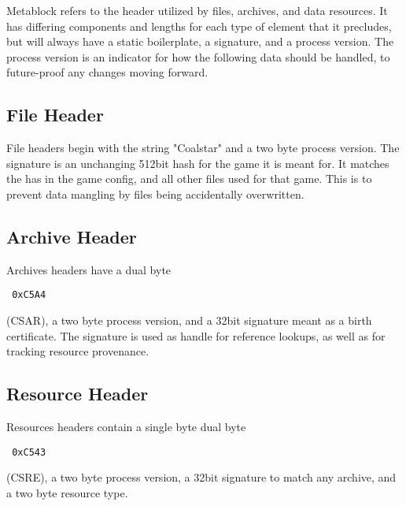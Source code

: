 Metablock refers to the header utilized by files, archives, and data resources. It has differing components and lengths for each type of element that it precludes, but will always have a static boilerplate, a signature, and a process version. The process version is an indicator for how the following data should be handled, to future-proof any changes moving forward.

\subsection{File Header}
File headers begin with the string "Coalstar" and a two byte process version. The signature is an unchanging 512bit hash for the game it is meant for. It matches the has in the game config, and all other files used for that game. This is to prevent data mangling by files being accidentally overwritten.

\subsection{Archive Header}
Archives headers have a dual byte \begin{verbatim} 0xC5A4 \end{verbatim}(CSAR), a two byte process version, and a 32bit signature meant as a birth certificate. The signature is used as handle for reference lookups, as well as for tracking resource provenance.

\subsection{Resource Header}
Resources headers contain a single byte dual byte \begin{verbatim} 0xC543 \end{verbatim}(CSRE), a two byte process version, a 32bit signature to match any archive, and a two byte resource type.
